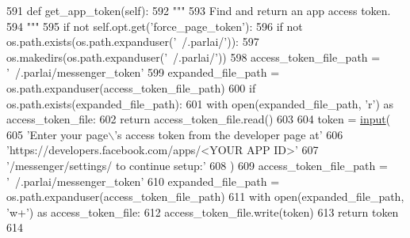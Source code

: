 \begin{DoxyCode}
591     \textcolor{keyword}{def }get\_app\_token(self):
592         \textcolor{stringliteral}{"""}
593 \textcolor{stringliteral}{        Find and return an app access token.}
594 \textcolor{stringliteral}{        """}
595         \textcolor{keywordflow}{if} \textcolor{keywordflow}{not} self.opt.get(\textcolor{stringliteral}{'force\_page\_token'}):
596             \textcolor{keywordflow}{if} \textcolor{keywordflow}{not} os.path.exists(os.path.expanduser(\textcolor{stringliteral}{'~/.parlai/'})):
597                 os.makedirs(os.path.expanduser(\textcolor{stringliteral}{'~/.parlai/'}))
598             access\_token\_file\_path = \textcolor{stringliteral}{'~/.parlai/messenger\_token'}
599             expanded\_file\_path = os.path.expanduser(access\_token\_file\_path)
600             \textcolor{keywordflow}{if} os.path.exists(expanded\_file\_path):
601                 with open(expanded\_file\_path, \textcolor{stringliteral}{'r') as access\_token\_file:}
602 \textcolor{stringliteral}{                    }\textcolor{keywordflow}{return} access\_token\_file.read()
603 
604         token = \hyperlink{namespaceparlai_1_1mturk_1_1core_1_1dev_1_1test_1_1test__full__system_a1e1817cd65688fb90f827834d1fb4567}{input}(
605             \textcolor{stringliteral}{'Enter your page\(\backslash\)'s access token from the developer page at'}
606             \textcolor{stringliteral}{'https://developers.facebook.com/apps/<YOUR APP ID>'}
607             \textcolor{stringliteral}{'/messenger/settings/ to continue setup:'}
608         )
609         access\_token\_file\_path = \textcolor{stringliteral}{'~/.parlai/messenger\_token'}
610         expanded\_file\_path = os.path.expanduser(access\_token\_file\_path)
611         with open(expanded\_file\_path, \textcolor{stringliteral}{'w+'}) \textcolor{keyword}{as} access\_token\_file:
612             access\_token\_file.write(token)
613         \textcolor{keywordflow}{return} token
614 
\end{DoxyCode}
\mbox{\label{classparlai_1_1chat__service_1_1services_1_1messenger_1_1messenger__manager_1_1MessengerManager_a172def2db5fc015d16f37baca685267c}} 
